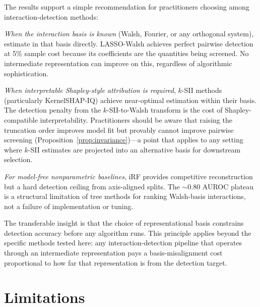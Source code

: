 \documentclass[11pt]{article}
\begin{document}
The results support a simple recommendation for practitioners
choosing among interaction-detection methods:

\emph{When the interaction basis is known} (Walsh, Fourier, or any
orthogonal system), estimate in that basis directly. LASSO-Walsh
achieves perfect pairwise detection at 5\% sample cost because
its coefficients are the quantities being screened. No intermediate
representation can improve on this, regardless of algorithmic
sophistication.

\emph{When interpretable Shapley-style attribution is required},
$k$-SII methods (particularly KernelSHAP-IQ) achieve near-optimal
estimation within their basis. The detection penalty from the
$k$-SII-to-Walsh transform is the cost of Shapley-compatible
interpretability. Practitioners should be aware that raising
the truncation order improves model fit but provably cannot
improve pairwise screening
(Proposition~\ref{prop:invariance})---a point that applies to
any setting where $k$-SII estimates are projected into an
alternative basis for downstream selection.

\emph{For model-free nonparametric baselines}, iRF provides
competitive reconstruction but a hard detection ceiling from
axis-aligned splits. The $\sim$0.80 AUROC plateau is a structural
limitation of tree methods for ranking Walsh-basis interactions,
not a failure of implementation or tuning.

The transferable insight is that the choice of representational
basis constrains detection accuracy before any algorithm runs.
This principle applies beyond the specific methods tested here:
any interaction-detection pipeline that operates through an
intermediate representation pays a basis-misalignment cost
proportional to how far that representation is from the
detection target.


\section{Limitations}
\label{sec:limitations}
\end{document}
